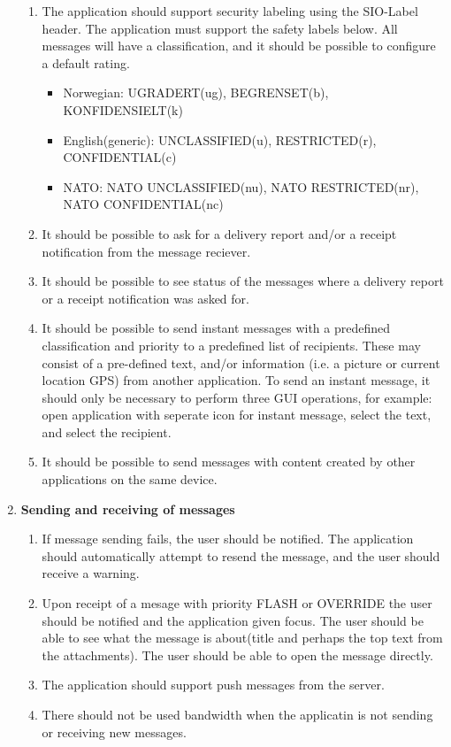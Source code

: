 \begin{enumerate}
\begin{enumerate}
\item{}The application should support security labeling using the SIO-Label header. The application must support the safety labels below. All messages will have a classification, and it should be possible to configure a default rating.
\begin{itemize}
\item{}Norwegian: UGRADERT(ug), BEGRENSET(b), KONFIDENSIELT(k)
\item{}English(generic): UNCLASSIFIED(u), RESTRICTED(r), CONFIDENTIAL(c)
\item{}NATO: NATO UNCLASSIFIED(nu), NATO RESTRICTED(nr), NATO CONFIDENTIAL(nc)
\end{itemize}
\item{}It should be possible to ask for a delivery report and/or a receipt notification from the message reciever.
\item{}It should be possible to see status of the messages where a delivery report or a receipt notification was asked for.
\item{}It should be possible to send instant messages with a predefined classification and priority to a predefined list of recipients. These may consist of a pre-defined text, and/or information (i.e. a picture or current location GPS) from another application. To send an instant message, it should only be necessary to perform three GUI operations, for example: open application with seperate icon for instant message, select the text, and select the recipient.
\item{}It should be possible to send messages with content created by other applications on the same device.
\end{enumerate}
\item{}\textbf{Sending and receiving of messages}
\begin{enumerate}
\item{}If message sending fails, the user should be notified. The application should automatically attempt to resend the message, and the user should receive a warning.
\item{}Upon receipt of a mesage with priority FLASH or OVERRIDE the user should be notified and the application given focus. The user should be able to see what the message is about(title and perhaps the top text from the attachments). The user should be able to open the message directly.
\item{}The application should support push messages from the server.
\item{}There should not be used bandwidth when the applicatin is not sending or receiving new messages.

\end{enumerate}
\end{enumerate}
